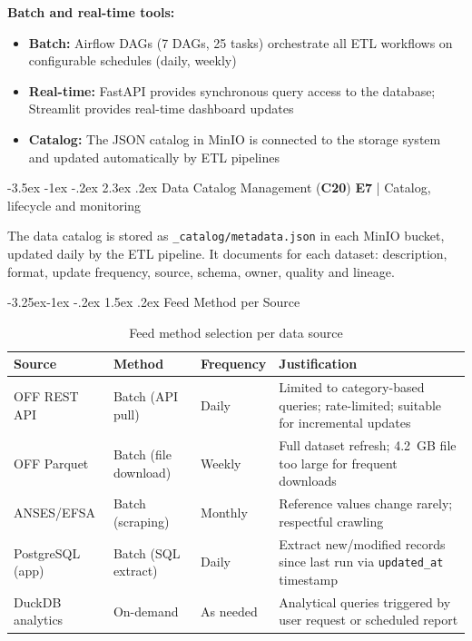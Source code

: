 \documentclass[a4paper,11pt,oneside,openany]{report}
\makeatletter
\renewcommand\section{\@startsection{section}{1}{\z@}%
  {-3.5ex \@plus -1ex \@minus -.2ex}%
  {2.3ex \@plus.2ex}%
  {\normalfont\Large\bfseries\color{ntgreen}}}
\renewcommand\subsection{\@startsection{subsection}{2}{\z@}%
  {-3.25ex\@plus -1ex \@minus -.2ex}%
  {1.5ex \@plus .2ex}%
  {\normalfont\large\bfseries\color{ntdarkgreen}}}
\newcommand{\competence}[1]{\textbf{\textcolor{ntgreen}{#1}}}
\newcommand{\evaluation}[1]{\textbf{\textcolor{ntblue}{#1}}}
\makeatother
\begin{document}
\textbf{Batch and real-time tools:}
\begin{itemize}[nosep]
  \item \textbf{Batch:} Airflow DAGs (7 DAGs, 25 tasks) orchestrate all
        ETL workflows on configurable schedules (daily, weekly)
  \item \textbf{Real-time:} FastAPI provides synchronous query access to
        the database; Streamlit provides real-time dashboard updates
  \item \textbf{Catalog:} The JSON catalog in MinIO is connected to the
        storage system and updated automatically by ETL pipelines
\end{itemize}


\section{Data Catalog Management (\competence{C20})}
\label{sec:c20}
{\small\evaluation{E7} | Catalog, lifecycle and monitoring}

The data catalog is stored as \texttt{\_catalog/metadata.json} in each
MinIO bucket, updated daily by the ETL pipeline. It documents for each
dataset: description, format, update frequency, source, schema, owner,
quality and lineage.

\subsection{Feed Method per Source}

\begin{table}[H]
\centering
\caption{Feed method selection per data source}
\label{tab:feed-methods}
\begin{tabularx}{\textwidth}{L{2.5cm} L{2cm} L{3cm} L{5cm}}
\toprule
\textbf{Source} & \textbf{Method} & \textbf{Frequency} & \textbf{Justification} \\
\midrule
OFF REST API & Batch (API pull) & Daily & Limited to category-based queries; rate-limited; suitable for incremental updates \\
OFF Parquet & Batch (file download) & Weekly & Full dataset refresh; 4.2~GB file too large for frequent downloads \\
ANSES/EFSA & Batch (scraping) & Monthly & Reference values change rarely; respectful crawling \\
PostgreSQL (app) & Batch (SQL extract) & Daily & Extract new/modified records since last run via \texttt{updated\_at} timestamp \\
DuckDB analytics & On-demand & As needed & Analytical queries triggered by user request or scheduled report \\
\bottomrule
\end{tabularx}
\end{table}
\end{document}
